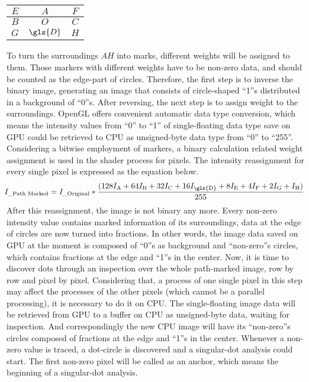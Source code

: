 \begin{center}
  \begin{tabular}{ | c | c | c | }
    \hline
    \(E\) & \(A\) & \(F\) \\ \hline
    \(B\) & \(O\) & \(C\) \\ \hline
    \(G\) & \(\gls{D}\) & \(H\) \\
    \hline
  \end{tabular}
\end{center}
%
To turn the surroundings \(A\)\texttildelow \(H\) into marks, different weights will be assigned to them. Those markers with different weights have to be non-zero data, and should be counted as the edge-part of circles. Therefore, the first step is to inverse the binary image, generating an image that consists of circle-shaped \enquote{1}s distributed in a background of \enquote{0}s.%
%
After reversing, the next step is to assign weight to the surroundings. OpenGL offers convenient automatic data type conversion, which means the intensity values from \enquote{0} to \enquote{1} of single-floating data type save on \gls{GPU} could be retrieved to CPU as unsigned-byte data type from \enquote{0} to \enquote{255}. Considering a bitwise employment of markers, a binary calculation related weight assignment is used in the shader process for pixels. The intensity reassignment for every single pixel is expressed as the equation below.
%
\begin{equation}
\hspace*{-0.1cm}%
%
I_{\text{\_Path Marked}} = I_{\text{\_Original}} * \frac{(128I_{\text{A}} + 64I_{\text{B}} + 32I_{\text{C}} + 16I_{\text{\gls{D}}} + 8I_{\text{E}} +  4I_{\text{F}} +  2I_{\text{G}}+I_{\text{H}})}{ 255 }
%
\label{snifferDistributionWeight}
\end{equation}%
\indent%
After this reassignment, the image is not binary any more. Every non-zero intensity value contains marked information of its surroundings, data at the edge of circles are now turned into fractions. In other words, the image data saved on \gls{GPU} at the moment is composed of \enquote{0}s as background and \enquote{non-zero}s circles, which contains fractions at the edge and \enquote{1}s in the center.%
%
Now, it is time to discover dots through an inspection over the whole path-marked image, row by row and pixel by pixel. Considering that, a process of one single pixel in this step may affect the processes of the other pixels (which cannot be a parallel processing), it is necessary to do it on CPU. The single-floating image data will be retrieved from \gls{GPU} to a buffer on CPU as unsigned-byte data, waiting for inspection. And correspondingly the new CPU image will have its \enquote{non-zero}s circles composed of fractions at the edge and \enquote{1}s in the center. Whenever a non-zero value is traced, a dot-circle is discovered and a singular-dot analysis could start. The first non-zero pixel will be called as an anchor, which means the beginning of a singular-dot analysis. %
